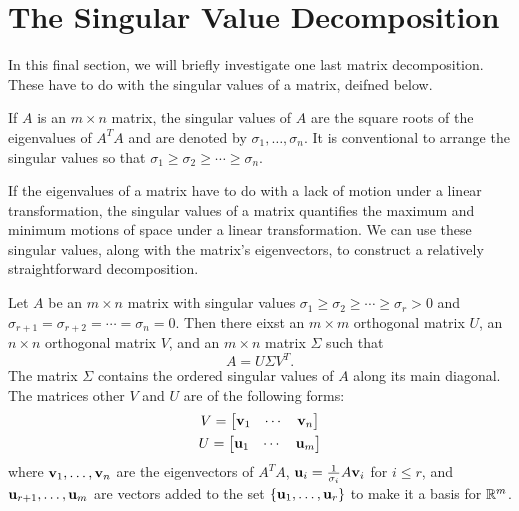 \documentclass[../m073main.tex]{subfiles}
\begin{document}
\section{The Singular Value Decomposition}
In this final section, we will briefly investigate one last matrix decomposition.
These have to do with the singular values of a matrix, deifned below.

\begin{definition}
	If $A$ is an $m \times n$ matrix, the singular values of $A$ are the square roots of the eigenvalues of $A^T A$ and are denoted by $\sigma_1, \ldots, \sigma_n$. It is conventional to arrange the singular values so that $\sigma_1 \geq \sigma_2 \geq \cdots \geq \sigma_n$.
\end{definition}

If the eigenvalues of a matrix have to do with a lack of motion under a linear transformation, the singular values of a matrix quantifies the maximum and minimum motions of space under a linear transformation.
We can use these singular values, along with the matrix's eigenvectors, to construct a relatively straightforward decomposition.

\begin{theorem}
	Let $A$ be an $m \times n$ matrix with singular values $\sigma_1 \geq \sigma_2 \geq \cdots \geq \sigma_r > 0$ and $\sigma_{r+1} = \sigma_{r+2} = \cdots = \sigma_n = 0$.
	Then there eixst an $m \times m$ orthogonal matrix $U$, an $n \times n$ orthogonal matrix $V$, and an $m \times n$ matrix $\Sigma$ such that
	\[ A = U \Sigma V^T. \]
	The matrix $\Sigma$ contains the ordered singular values of $A$ along its main diagonal.
	The matrices other $V$ and $U$ are of the following forms:
	\begin{gather*}
		V = \begin{bmatrix} \mathbf{v}_1 & \cdots & \mathbf{v}_n \end{bmatrix} \\
		U = \begin{bmatrix} \mathbf{u}_1 & \cdots & \mathbf{u}_m \end{bmatrix}
	\end{gather*}
	where $\mathbf{v}_1, \ldots, \mathbf{v}_n$ are the eigenvectors of $A^T A$, $\mathbf{u}_i = \frac{1}{\sigma_i} A \mathbf{v}_i$ for $i \leq r$, and $\mathbf{u}_{r+1}, \ldots, \mathbf{u}_m$ are vectors added to the set $\{ \mathbf{u}_1, \ldots, \mathbf{u}_r \}$ to make it a basis for $\mathbb{R}^m$.
\end{theorem}
\end{document}
